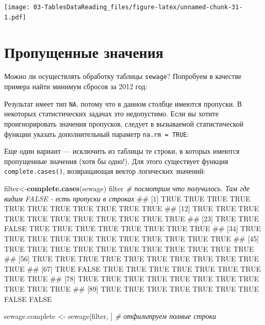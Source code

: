 \documentclass[]{book}
\newenvironment{Shaded}{\begin{snugshade}}{\end{snugshade}}
\newcommand{\KeywordTok}[1]{\textcolor[rgb]{0.13,0.29,0.53}{\textbf{#1}}}
\newcommand{\DataTypeTok}[1]{\textcolor[rgb]{0.13,0.29,0.53}{#1}}
\newcommand{\StringTok}[1]{\textcolor[rgb]{0.31,0.60,0.02}{#1}}
\newcommand{\CommentTok}[1]{\textcolor[rgb]{0.56,0.35,0.01}{\textit{#1}}}
\newcommand{\OtherTok}[1]{\textcolor[rgb]{0.56,0.35,0.01}{#1}}
\newcommand{\OperatorTok}[1]{\textcolor[rgb]{0.81,0.36,0.00}{\textbf{#1}}}
\newcommand{\NormalTok}[1]{#1}
\begin{document}
\texttt{[image: 03-TablesDataReading\_files/figure-latex/unnamed-chunk-31-1.pdf]}

\section{Пропущенные значения}\label{missed_values}

Можно ли осуществлять обработку таблицы \texttt{sewage}? Попробуем в
качестве примера найти минимум сбросов за 2012 год:

\begin{Shaded}
\end{Shaded}

Результат имеет тип \texttt{NA}, потому что в данном столбце имеются
пропуски. В некоторых статистических задачах это недопустимо. Если вы
хотите проигнорировать значения пропусков, следует в вызываемой
статистической функции указать дополнительный параметр
\texttt{na.rm\ =\ TRUE}:

\begin{Shaded}
\end{Shaded}

Еще один вариант --- исключить из таблицы те строки, в которых имеются
пропущенные значения (хотя бы одно!). Для этого существует функция
\texttt{complete.cases()}, возвращающая вектор логических значений:

\begin{Shaded}
\begin{Highlighting}[]
\NormalTok{filter<-}\KeywordTok{complete.cases}\NormalTok{(sewage)}
\NormalTok{filter  }\CommentTok{# посмотрим что получилось. Там где видим FALSE - есть пропуски в строках}
\NormalTok{##  [1]  TRUE  TRUE  TRUE  TRUE  TRUE  TRUE  TRUE  TRUE  TRUE  TRUE  TRUE}
\NormalTok{## [12]  TRUE  TRUE  TRUE  TRUE  TRUE  TRUE  TRUE  TRUE  TRUE  TRUE  TRUE}
\NormalTok{## [23]  TRUE  TRUE FALSE  TRUE  TRUE  TRUE  TRUE  TRUE  TRUE  TRUE  TRUE}
\NormalTok{## [34]  TRUE  TRUE  TRUE  TRUE  TRUE  TRUE  TRUE  TRUE  TRUE  TRUE  TRUE}
\NormalTok{## [45]  TRUE  TRUE  TRUE  TRUE  TRUE  TRUE  TRUE  TRUE  TRUE  TRUE  TRUE}
\NormalTok{## [56]  TRUE  TRUE  TRUE  TRUE  TRUE  TRUE  TRUE  TRUE  TRUE  TRUE  TRUE}
\NormalTok{## [67]  TRUE FALSE  TRUE  TRUE  TRUE  TRUE  TRUE  TRUE  TRUE  TRUE  TRUE}
\NormalTok{## [78]  TRUE  TRUE  TRUE  TRUE  TRUE  TRUE  TRUE  TRUE  TRUE  TRUE  TRUE}
\NormalTok{## [89]  TRUE  TRUE  TRUE  TRUE  TRUE  TRUE  TRUE FALSE FALSE}

\NormalTok{sewage.complete <-}\StringTok{ }\NormalTok{sewage[filter, ] }\CommentTok{# отфильтруем полные строки}
\end{Highlighting}
\end{Shaded}
\end{document}
